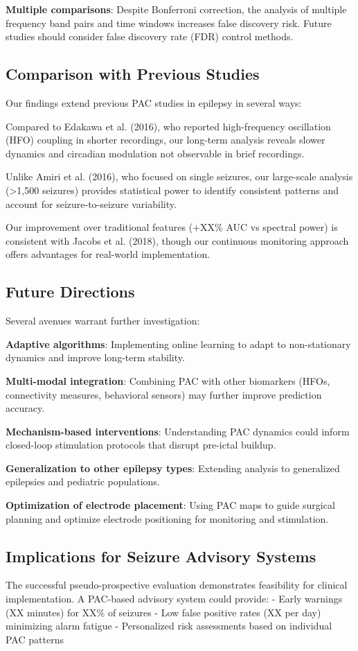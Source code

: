 \textbf{Multiple comparisons}: Despite Bonferroni correction, the analysis of multiple frequency band pairs and time windows increases false discovery risk. Future studies should consider false discovery rate (FDR) control methods.

\subsection{Comparison with Previous Studies}
Our findings extend previous PAC studies in epilepsy in several ways:

Compared to Edakawa et al. (2016), who reported high-frequency oscillation (HFO) coupling in shorter recordings, our long-term analysis reveals slower dynamics and circadian modulation not observable in brief recordings.

Unlike Amiri et al. (2016), who focused on single seizures, our large-scale analysis (>1,500 seizures) provides statistical power to identify consistent patterns and account for seizure-to-seizure variability.

Our improvement over traditional features (+XX\% AUC vs spectral power) is consistent with Jacobs et al. (2018), though our continuous monitoring approach offers advantages for real-world implementation.

\subsection{Future Directions}

Several avenues warrant further investigation:

\textbf{Adaptive algorithms}: Implementing online learning to adapt to non-stationary dynamics and improve long-term stability.

\textbf{Multi-modal integration}: Combining PAC with other biomarkers (HFOs, connectivity measures, behavioral sensors) may further improve prediction accuracy.

\textbf{Mechanism-based interventions}: Understanding PAC dynamics could inform closed-loop stimulation protocols that disrupt pre-ictal buildup.

\textbf{Generalization to other epilepsy types}: Extending analysis to generalized epilepsies and pediatric populations.

\textbf{Optimization of electrode placement}: Using PAC maps to guide surgical planning and optimize electrode positioning for monitoring and stimulation.

\subsection{Implications for Seizure Advisory Systems}
The successful pseudo-prospective evaluation demonstrates feasibility for clinical implementation. A PAC-based advisory system could provide:
- Early warnings (XX minutes) for XX\% of seizures
- Low false positive rates (XX per day) minimizing alarm fatigue
- Personalized risk assessments based on individual PAC patterns

